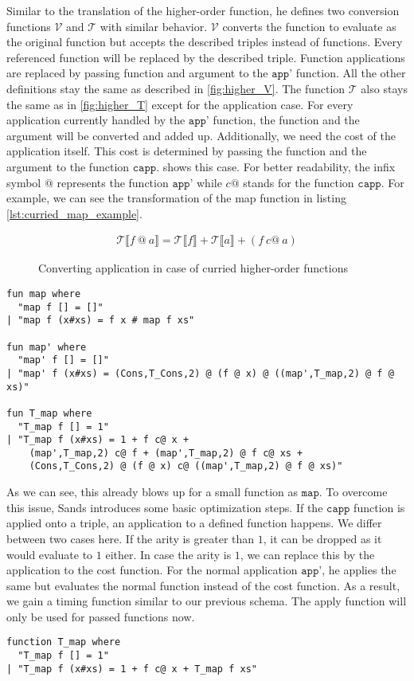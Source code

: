 Similar to the translation of the higher-order function, he defines two conversion functions $\mathcal{V}$ and $\mathcal{T}$ with similar behavior.
$\mathcal{V}$ converts the function to evaluate as the original function but accepts the described triples instead of functions.
Every referenced function will be replaced by the described triple.
Function applications are replaced by passing function and argument to the $\texttt{app'}$ function.
All the other definitions stay the same as described in \autoref{fig:higher_V}.
The function $\mathcal{T}$ also stays the same as in \autoref{fig:higher_T} except for the application case.
For every application currently handled by the $\texttt{app'}$ function, the function and the argument will be converted and added up.
Additionally, we need the cost of the application itself.
This cost is determined by passing the function and the argument to the function $\texttt{capp}$.
 shows this case.
For better readability, the infix symbol $@$ represents the function $\texttt{app'}$ while $c@$ stands for the function $\texttt{capp}$.
For example, we can see the transformation of the map function in listing \ref{lst:curried_map_example}.
\begin{figure}
\begin{align*}
  \mathcal{T}\llbracket f\ @\ a\rrbracket = \mathcal{T}\llbracket f\rrbracket + \mathcal{T}\llbracket a\rrbracket + (f\ c@\ a)
\end{align*}
\caption{Converting application in case of curried higher-order functions}
\label{fig:curried_T_apply}
\end{figure}

\begin{lstlisting}[language=isabelle,mathescape=true,label=lst:curried_map_example,caption=Example translation for map function]
fun map where
  "map f [] = []"
| "map f (x#xs) = f x # map f xs"

fun map' where
  "map' f [] = []"
| "map' f (x#xs) = (Cons,T_Cons,2) @ (f @ x) @ ((map',T_map,2) @ f @ xs)"

fun T_map where
  "T_map f [] = 1"
| "T_map f (x#xs) = 1 + f c@ x +
    (map',T_map,2) c@ f + (map',T_map,2) @ f c@ xs +
    (Cons,T_Cons,2) @ (f @ x) c@ ((map',T_map,2) @ f @ xs)"
\end{lstlisting}

As we can see, this already blows up for a small function as $\texttt{map}$.
To overcome this issue, Sands introduces some basic optimization steps.
If the $\texttt{capp}$ function is applied onto a triple, an application to a defined function happens.
We differ between two cases here.
If the arity is greater than $1$, it can be dropped as it would evaluate to $1$ either.
In case the arity is $1$, we can replace this by the application to the cost function.
For the normal application $\texttt{app'}$, he applies the same but evaluates the normal function instead of the cost function.
As a result, we gain a timing function similar to our previous schema.
The apply function will only be used for passed functions now.
\begin{lstlisting}[language=isabelle,mathescape=true]
function T_map where
  "T_map f [] = 1"
| "T_map f (x#xs) = 1 + f c@ x + T_map f xs"
\end{lstlisting}

